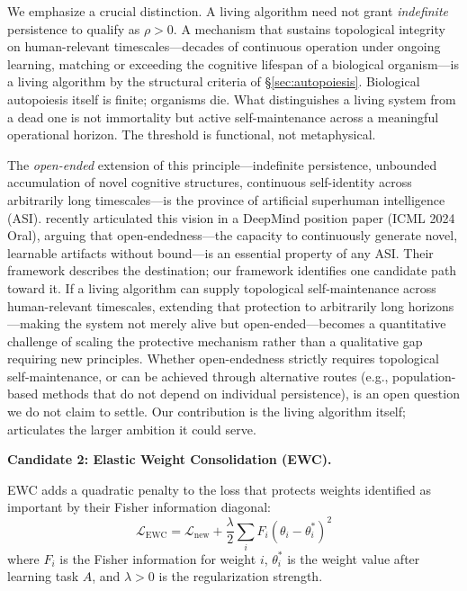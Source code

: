 \documentclass{article}
\begin{document}
We emphasize a crucial distinction. A living algorithm need not grant \emph{indefinite} persistence to qualify as $\rho > 0$. A mechanism that sustains topological integrity on human-relevant timescales---decades of continuous operation under ongoing learning, matching or exceeding the cognitive lifespan of a biological organism---is a living algorithm by the structural criteria of \S\ref{sec:autopoiesis}. Biological autopoiesis itself is finite; organisms die. What distinguishes a living system from a dead one is not immortality but active self-maintenance across a meaningful operational horizon. The threshold is functional, not metaphysical.

The \emph{open-ended} extension of this principle---indefinite persistence, unbounded accumulation of novel cognitive structures, continuous self-identity across arbitrarily long timescales---is the province of artificial superhuman intelligence (ASI). \citet{Hughes2024openendedness} recently articulated this vision in a DeepMind position paper (ICML 2024 Oral), arguing that open-endedness---the capacity to continuously generate novel, learnable artifacts without bound---is an essential property of any ASI. Their framework describes the destination; our framework identifies one candidate path toward it. If a living algorithm can supply topological self-maintenance across human-relevant timescales, extending that protection to arbitrarily long horizons---making the system not merely alive but open-ended---becomes a quantitative challenge of scaling the protective mechanism rather than a qualitative gap requiring new principles. Whether open-endedness strictly requires topological self-maintenance, or can be achieved through alternative routes (e.g., population-based methods that do not depend on individual persistence), is an open question we do not claim to settle. Our contribution is the living algorithm itself; \citet{Hughes2024openendedness} articulates the larger ambition it could serve.

\medskip
\noindent\textbf{Candidate 2: Elastic Weight Consolidation (EWC).}

EWC \citep{Kirkpatrick2017ewc} adds a quadratic penalty to the loss that protects weights identified as important by their Fisher information diagonal:
\begin{equation}
\mathcal{L}_{\text{EWC}} = \mathcal{L}_{\text{new}} + \frac{\lambda}{2} \sum_i F_i (\theta_i - \theta_i^*)^2
\end{equation}
where $F_i$ is the Fisher information for weight $i$, $\theta_i^*$ is the weight value after learning task $A$, and $\lambda > 0$ is the regularization strength.
\end{document}
